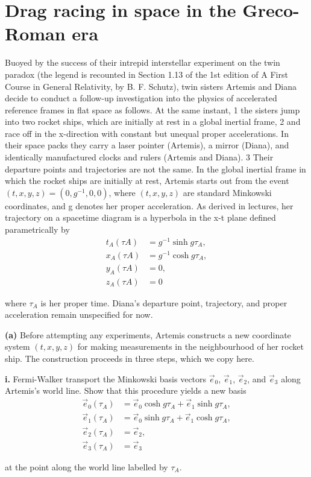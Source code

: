 \documentclass[a4paper]{article} %
\begin{document}
\section{Drag racing in space in the Greco-Roman era}
\begin{framed}
Buoyed by the success of their intrepid interstellar experiment on the twin paradox (the legend is recounted in Section 1.13 of the 1st edition of A First Course in General Relativity, by B. F. Schutz), twin sisters Artemis and Diana decide to conduct a follow-up investigation into the physics of accelerated reference frames in flat space as follows. At the same instant, 1 the sisters jump into two rocket ships, which are initially at rest in a global inertial frame, 2 and race off in the x-direction with constant but unequal proper accelerations. In their space packs they carry a laser pointer (Artemis), a mirror (Diana), and identically manufactured clocks and rulers (Artemis and Diana). 3 Their departure points and trajectories are not the same. In the global inertial frame in which the rocket ships are initially at rest, Artemis starts out from the event $(t, x, y, z) = (0, g^{-1}, 0, 0)$, where $(t, x, y, z)$ are standard Minkowski coordinates, and g denotes her proper acceleration. As derived in lectures, her trajectory on a spacetime diagram is a hyperbola in the x-t plane defined parametrically by
\begin{align}
t_A(\tau A) &= g^{-1} \sinh g\tau_A,\label{eq1}\\
x_A(\tau A) &= g^{-1} \cosh g\tau_A,\label{eq2}\\
y_A(\tau A) &= 0,\\
z_A(\tau A) &= 0
\end{align}

where $\tau_A$ is her proper time. Diana’s departure point, trajectory, and proper acceleration remain unspecified for now.
\end{framed}

\begin{framed}
\textbf{(a)}
Before attempting any experiments, Artemis constructs a new coordinate system $(t, x, y, z)$ for making measurements in the neighbourhood of her rocket ship. The construction proceeds in three steps, which we copy here. 
\end{framed}

\begin{framed}
\textbf{i.} 
Fermi-Walker transport the Minkowski basis vectors $\vec{e}_0$, $\vec{e}_1$, $\vec{e}_2$, and $\vec{e}_3$ along Artemis’s world line. Show that this procedure yields a new basis
\begin{align}
\vec{e}_0(\tau_A) &= \vec{e}_0 \cosh g\tau_A +\vec{e}_1 \sinh g\tau_A,\label{ai. eq1}\\
\vec{e}_1(\tau_A) &= \vec{e}_0 \sinh g\tau_A +\vec{e}_1 \cosh g\tau_A,\\
\vec{e}_2(\tau_A) &= \vec{e}_2,\\
\vec{e}_3(\tau_A) &= \vec{e}_3\label{ai. eq4}
\end{align}

at the point along the world line labelled by $\tau_A$.
\end{framed}
\end{document}
